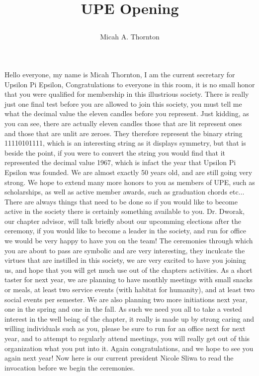 \title{UPE Opening\author{Micah A. Thornton}}

\maketitle{}
    Hello everyone, my name is Micah Thornton, I am the current secretary for Upsilon Pi Epsilon, Congratulations to everyone in this room, it is no small honor that you were qualified for membership in this illustrious society. There is really just one final test before you are allowed to join this society, you must tell me what the decimal value the eleven candles before you represent. Just kidding, as you can see, there are actually eleven candles those that are lit represent ones and those that are unlit are zeroes. They therefore represent the binary string 11110101111, which is an interesting string as it displays symmetry, but that is beside the point, if you were to convert the string you would find that it represented the decimal value 1967, which is infact the year that Upsilon Pi Epsilon was founded. We are almost exactly 50 years old, and are still going very strong. We hope to extend many more honors to you as members of UPE, such as scholarships, as well as active member awards, such as graduation chords etc... There are always things that need to be done so if you would like to become active in the society there is certainly something available to you. Dr. Dworak, our chapter advisor, will talk briefly about our upcomming elections after the ceremony, if you would like to become a leader in the society, and run for office we would be very happy to have you on the team! The ceremonies through which you are about to pass are symbolic and are very interesting, they inculcate the virtues that are instilled in this society, we are very excited to have you joining us, and hope that you will get much use out of the chapters activities. As a short taster for next year, we are planning to have monthly meetings with small snacks or meals, at least two service events (with habitat for humanity), and at least two social events per semester. We are also planning two more initiations next year, one in the spring and one in the fall. As such we need you all to take a vested interest in the well being of the chapter, it really is made up by strong caring and willing individuals such as you, please be sure to run for an office next for next year, and to attempt to regularly attend meetings, you will really get out of this organization what you put into it. Again congratulations, and we hope to see you again next year! Now here is our current president Nicole Sliwa to read the invocation before we begin the ceremonies. 
